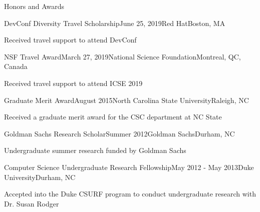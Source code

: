 \documentclass{resume} %
\begin{document}
\begin{rSection}{Honors and Awards}

\begin{rSubsection}
{DevConf Diversity Travel Scholarship}{June 25, 2019}{Red Hat}{Boston, MA}
\item Received travel support to attend DevConf
\end{rSubsection}

\begin{rSubsection}
{NSF Travel Award}{March 27, 2019}{National Science Foundation}{Montreal, QC, Canada}
\item Received travel support to attend ICSE 2019
\end{rSubsection}

\begin{rSubsection}
{Graduate Merit Award}{August 2015}{North Carolina State University}{Raleigh, NC}
\item Received a graduate merit award for the CSC department at NC State
\end{rSubsection}

\begin{rSubsection}
{Goldman Sachs Research Scholar}{Summer 2012}{Goldman Sachs}{Durham, NC}
\item Undergraduate summer research funded by Goldman Sachs
\end{rSubsection}

\begin{rSubsection}
{Computer Science Undergraduate Research Fellowship}{May 2012 - May 2013}{Duke University}{Durham, NC}
\item Accepted into the Duke CSURF program to conduct undergraduate research with Dr. Susan Rodger
\end{rSubsection}

\end{rSection}
\end{document}
